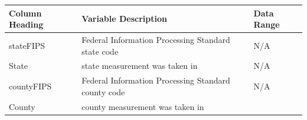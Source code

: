 \documentclass[12pt,]{article}
\begin{document}
\begin{longtable}[]{@{}lll@{}}
\toprule
\begin{minipage}[b]{0.22\columnwidth}\raggedright
\textbf{Column Heading}\strut
\end{minipage} & \begin{minipage}[b]{0.46\columnwidth}\raggedright
\textbf{Variable Description}\strut
\end{minipage} & \begin{minipage}[b]{0.23\columnwidth}\raggedright
\textbf{Data Range}\strut
\end{minipage}\tabularnewline
\midrule
\endhead
\begin{minipage}[t]{0.22\columnwidth}\raggedright
stateFIPS\strut
\end{minipage} & \begin{minipage}[t]{0.46\columnwidth}\raggedright
Federal Information Processing Standard state code\strut
\end{minipage} & \begin{minipage}[t]{0.23\columnwidth}\raggedright
N/A\strut
\end{minipage}\tabularnewline
\begin{minipage}[t]{0.22\columnwidth}\raggedright
State\strut
\end{minipage} & \begin{minipage}[t]{0.46\columnwidth}\raggedright
state measurement was taken in\strut
\end{minipage} & \begin{minipage}[t]{0.23\columnwidth}\raggedright
N/A\strut
\end{minipage}\tabularnewline
\begin{minipage}[t]{0.22\columnwidth}\raggedright
countyFIPS\strut
\end{minipage} & \begin{minipage}[t]{0.46\columnwidth}\raggedright
Federal Information Processing Standard county code\strut
\end{minipage} & \begin{minipage}[t]{0.23\columnwidth}\raggedright
N/A\strut
\end{minipage}\tabularnewline
\begin{minipage}[t]{0.22\columnwidth}\raggedright
County\strut
\end{minipage} & \begin{minipage}[t]{0.46\columnwidth}\raggedright
county measurement was taken in\strut
\end{minipage} & \begin{minipage}[t]{0.23\columnwidth}\raggedright

\end{minipage}
\end{longtable}
\end{document}

